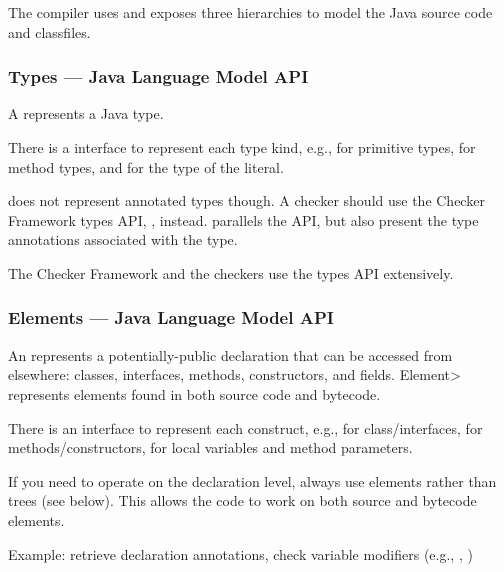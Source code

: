 The compiler uses and exposes three hierarchies to model the Java
source code and classfiles.


\subsubsection{Types --- Java Language Model API\label{javac-types}}

A  represents a Java type.

\begin{sloppypar}
There is a  interface to represent each type kind,
e.g.,  for primitive types, 
for method types, and  for the type of the  literal.
\end{sloppypar}

 does not represent annotated types though.  A checker
should use the Checker Framework types API,
, instead.  
parallels the  API, but also present the type annotations
associated with the type.

The Checker Framework and the checkers use the types API extensively.


\subsubsection{Elements --- Java Language Model API\label{javac-elements}}

An  represents a potentially-public
declaration that can be accessed from elsewhere:  classes, interfaces, methods, constructors, and
fields.  \<Element> represents elements found in both source
code and bytecode.

There is an  interface to represent each construct, e.g.,
 for class/interfaces,  for
methods/constructors,  for local variables and
method parameters.

If you need to operate on the declaration level, always use elements rather
than trees
(see below).  This allows the code to work on
both source and bytecode elements.

Example: retrieve declaration annotations, check variable
modifiers (e.g., , )


